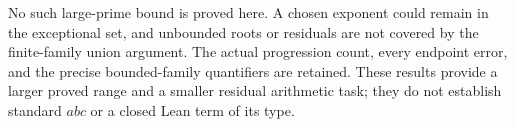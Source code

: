 No such large-prime bound is proved here. A chosen exponent could remain in
the exceptional set, and unbounded roots or residuals are not covered by the
finite-family union argument. The actual progression count, every endpoint
error, and the precise bounded-family quantifiers are retained. These results
provide a larger proved range and a smaller residual arithmetic task; they do
not establish standard $abc$ or a closed Lean term of its type.
